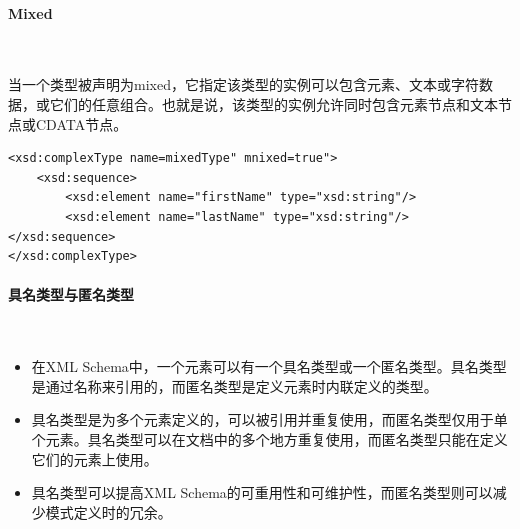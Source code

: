 \paragraph*{Mixed}~{} \par
当一个类型被声明为mixed，它指定该类型的实例可以包含元素、文本或字符数据，或它们的任意组合。也就是说，该类型的实例允许同时包含元素节点和文本节点或CDATA节点。
\begin{lstlisting}
<xsd:complexType name=mixedType" mnixed=true">
	<xsd:sequence>
		<xsd:element name="firstName" type="xsd:string"/>
		<xsd:element name="lastName" type="xsd:string"/>
</xsd:sequence>
</xsd:complexType>
\end{lstlisting}

\paragraph*{具名类型与匿名类型}~{} \par
\begin{itemize}
	\item 在XML Schema中，一个元素可以有一个具名类型或一个匿名类型。具名类型是通过名称来引用的，而匿名类型是定义元素时内联定义的类型。
	\item 具名类型是为多个元素定义的，可以被引用并重复使用，而匿名类型仅用于单个元素。具名类型可以在文档中的多个地方重复使用，而匿名类型只能在定义它们的元素上使用。
	\item 具名类型可以提高XML Schema的可重用性和可维护性，而匿名类型则可以减少模式定义时的冗余。
\end{itemize}

